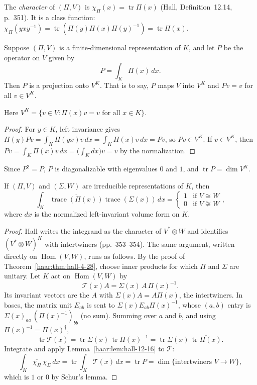 The \emph{character} of $(\Pi,V)$ is $\chi_\Pi(x)=\operatorname{tr}\Pi(x)$
(Hall, Definition~12.14, p.~351). It is a class function:
$\chi_\Pi(yxy^{-1})=\operatorname{tr}(\Pi(y)\Pi(x)\Pi(y)^{-1})
=\operatorname{tr}\Pi(x)$.
\begin{lemma}\label{haar:lem:hall-12-16}
Suppose $(\Pi,V)$ is a finite-dimensional representation of $K$, and let
$P$ be the operator on $V$ given by
\[
 P=\int_K\Pi(x)\,dx.
\]
Then $P$ is a projection onto $V^K$. That is to say, $P$ maps $V$ into $V^K$
and $Pv=v$ for all $v\in V^K$.
\end{lemma}
Here $V^K=\{v\in V:\Pi(x)v=v\text{ for all }x\in K\}$.
\begin{proof}
For $y\in K$, left invariance gives
$\Pi(y)Pv=\int_K\Pi(yx)v\,dx=\int_K\Pi(x)v\,dx=Pv$, so $Pv\in V^K$. If
$v\in V^K$, then $Pv=\int_K\Pi(x)v\,dx=\big(\int_Kdx\big)v=v$ by the
normalization.
\end{proof}
Since $P^2=P$, $P$ is diagonalizable with eigenvalues $0$ and $1$, and
$\operatorname{tr}P=\dim V^K$.
\begin{theorem}\label{haar:thm:hall-12-15}
If $(\Pi,V)$ and $(\Sigma,W)$ are irreducible representations of $K$, then
\[
 \int_K\overline{\operatorname{trace}(\Pi(x))}\operatorname{trace}(\Sigma(x))\,dx
 =\begin{cases}1&\text{if }V\cong W\\ 0&\text{if }V\not\cong W\end{cases},
\]
where $dx$ is the normalized left-invariant volume form on $K$.
\end{theorem}
\begin{proof}
Hall writes the integrand as the character of $V^*\otimes W$ and identifies
$(V^*\otimes W)^K$ with intertwiners (pp.~353--354). The same argument,
written directly on $\operatorname{Hom}(V,W)$, runs as follows. By the
proof of Theorem~\ref{haar:thm:hall-4-28}, choose inner products for which
$\Pi$ and $\Sigma$ are unitary. Let $K$ act on $\operatorname{Hom}(V,W)$ by
\begin{equation}
 \mathcal T(x)A=\Sigma(x)\,A\,\Pi(x)^{-1}.
\end{equation}
Its invariant vectors are the $A$ with $\Sigma(x)A=A\Pi(x)$, the
intertwiners. In bases, the matrix unit $E_{ab}$ is sent to
$\Sigma(x)E_{ab}\Pi(x)^{-1}$, whose $(a,b)$ entry is
$\Sigma(x)_{aa}\,(\Pi(x)^{-1})_{bb}$ (no sum). Summing over $a$ and $b$, and
using $\Pi(x)^{-1}=\Pi(x)^\dagger$,
\begin{equation}
 \operatorname{tr}\mathcal T(x)=\operatorname{tr}\Sigma(x)\,\operatorname{tr}\Pi(x)^{-1}
 =\operatorname{tr}\Sigma(x)\,\overline{\operatorname{tr}\Pi(x)} .
\end{equation}
Integrate and apply Lemma~\ref{haar:lem:hall-12-16} to $\mathcal T$:
\begin{equation}
 \int_K\overline{\chi_\Pi}\,\chi_\Sigma\,dx
 =\operatorname{tr}\int_K\mathcal T(x)\,dx=\operatorname{tr}P
 =\dim\{\text{intertwiners }V\to W\},
\end{equation}
which is $1$ or $0$ by Schur's lemma.
\end{proof}
